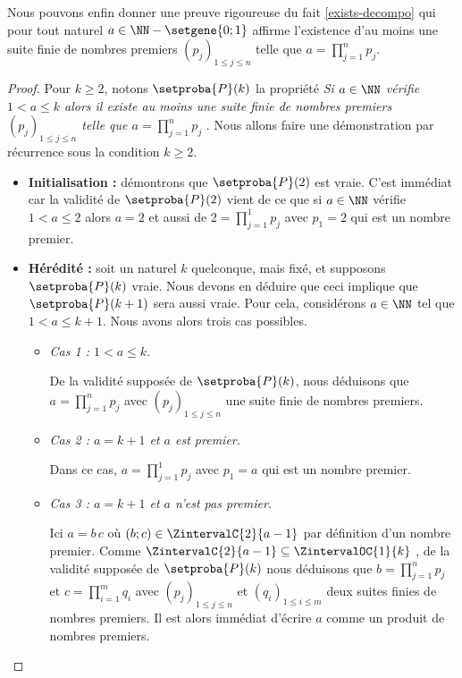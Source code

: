 Nous pouvons enfin donner une preuve rigoureuse du fait \ref{exists-decompo} qui pour tout naturel $a \in \NN - \setgene{0 ; 1}$ affirme l'existence d'au moins une suite finie de nombres premiers $(p_j)_{1 \leq j \leq n}$ telle que $\displaystyle a = \prod_{j=1}^{n} p_j$.


\begin{proof}
	Pour $k \geq 2$, notons $\setproba{P}(k)$ la propriété \emph{\og Si $a \in \NN$ vérifie $1 < a \leq k$ alors il existe au moins une suite finie de nombres premiers $(p_j)_{1 \leq j \leq n}$ telle que $\displaystyle a = \prod_{j=1}^{n} p_j$ \fg}. Nous allons faire une démonstration par récurrence sous la condition $k \geq 2$.
	
	\begin{itemize}[label=\small\textbullet]
		\medskip
		\item \textbf{Initialisation :} démontrons que $\setproba{P}(2)$ est vraie. C'est immédiat car la validité de $\setproba{P}(2)$ vient de ce que si $a \in \NN$ vérifie $1 < a \leq 2$ alors $a = 2$ et aussi de $\displaystyle 2 = \prod_{j=1}^{1} p_j$ avec $p_1 = 2$ qui est un nombre premier. 


		\medskip
		\item \textbf{Hérédité :} soit un naturel $k$ quelconque, mais fixé, et supposons $\setproba{P}(k)$ vraie. Nous devons en déduire que ceci implique que $\setproba{P}(k+1)$ sera aussi vraie.
		Pour cela, considérons $a \in \NN$ tel que $1 < a \leq k + 1$. Nous avons alors trois cas possibles.
		\begin{itemize}
			\smallskip
			\item \emph{Cas 1 : $1 < a \leq k$.}
			      
			      De la validité supposée de $\setproba{P}(k)$, nous déduisons que $\displaystyle a = \prod_{j=1}^{n} p_j$ avec $(p_j)_{1 \leq j \leq n}$ une suite finie de nombres premiers. 

			\smallskip
			\item \emph{Cas 2 : $a = k + 1$ et $a$ est premier.}
			      
			      Dans ce cas, $\displaystyle a = \prod_{j=1}^{1} p_j$ avec $p_1 = a$ qui est un nombre premier. 

			\smallskip
			\item \emph{Cas 3 : $a = k + 1$ et $a$ n'est pas premier.}
			      
			      Ici $a = b \, c$ où $(b ; c) \in \ZintervalC{2}{a-1}$ par définition d'un nombre premier.
			      Comme $\ZintervalC{2}{a-1} \subseteq \ZintervalOC{1}{k}$ , de la validité supposée de $\setproba{P}(k)$ nous déduisons que $\displaystyle b = \prod_{j=1}^{n} p_j$  et $\displaystyle c = \prod_{i=1}^{m} q_i$ avec $(p_j)_{1 \leq j \leq n}$ et $(q_i)_{1 \leq i \leq m}$ deux suites finies de nombres premiers. Il est alors immédiat d'écrire $a$ comme un produit de nombres premiers.
		\end{itemize}



\end{itemize}
\end{proof}
